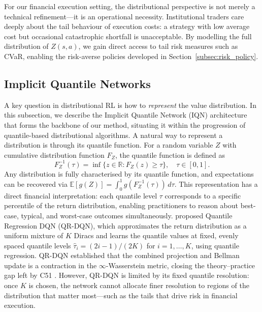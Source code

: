\documentclass[11pt]{article}
\begin{document}
For our financial execution setting, the distributional perspective is not merely a technical refinement---it is an operational necessity. Institutional traders care deeply about the tail behaviour of execution costs: a strategy with low average cost but occasional catastrophic shortfall is unacceptable. By modelling the full distribution of $Z(s,a)$, we gain direct access to tail risk measures such as CVaR, enabling the risk-averse policies developed in Section~\ref{subsec:risk_policy}.

\subsection*{Implicit Quantile Networks}\label{subsec:iqn}
 
A key question in distributional RL is how to \emph{represent} the value distribution. In this subsection, we describe the Implicit Quantile Network (IQN) architecture \citet{dabney2018implicit} that forms the backbone of our method, situating it within the progression of quantile-based distributional algorithms. A natural way to represent a distribution is through its quantile function. For a random variable $Z$ with cumulative distribution function $F_Z$, the quantile function is defined as
\begin{equation}\label{eq:quantile_fn}
    F_Z^{-1}(\tau) = \inf\{z \in \mathbb{R} : F_Z(z) \geq \tau\}, \quad \tau \in [0,1].
\end{equation}
Any distribution is fully characterised by its quantile function, and expectations can be recovered via $\mathbb{E}[g(Z)] = \int_0^1 g(F_Z^{-1}(\tau))\,d\tau$. This representation has a direct financial interpretation: each quantile level $\tau$ corresponds to a specific percentile of the return distribution, enabling practitioners to reason about best-case, typical, and worst-case outcomes simultaneously. \citet{dabney2018quantile} proposed Quantile Regression DQN (QR-DQN), which approximates the return distribution as a uniform mixture of $K$ Diracs and learns the quantile values at fixed, evenly spaced quantile levels $\hat{\tau}_i = (2i-1)/(2K)$ for $i = 1, \ldots, K$, using quantile regression. QR-DQN established that the combined projection and Bellman update is a contraction in the $\infty$-Wasserstein metric, closing the theory--practice gap left by C51 \citet{bellemare2017distributional}. However, QR-DQN is limited by its fixed quantile resolution: once $K$ is chosen, the network cannot allocate finer resolution to regions of the distribution that matter most---such as the tails that drive risk in financial execution.
 
\end{document}
